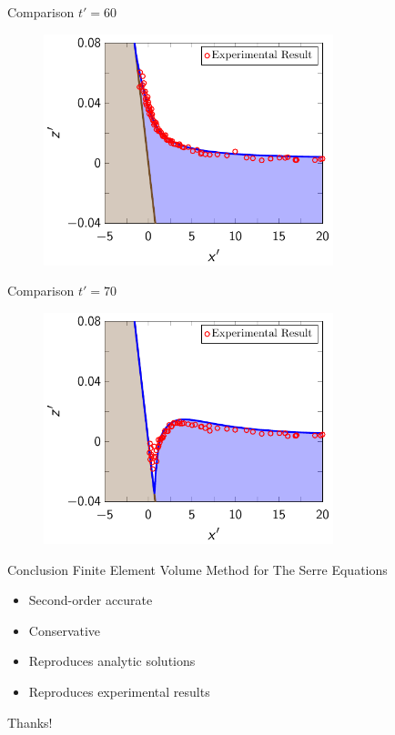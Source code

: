 \documentclass[pdf]{beamer}
\begin{document}
\begin{frame}{Comparison $t'=60$}
	\begin{figure}
		\includegraphics[width=0.75\textwidth]{./Pics/Synolakis/t=60s.pdf}
	\end{figure}
\end{frame}

\begin{frame}{Comparison $t'=70$}
	\begin{figure}
		\includegraphics[width=0.75\textwidth]{./Pics/Synolakis/t=70s.pdf}
	\end{figure}
\end{frame}

\begin{frame}{Conclusion}
	Finite Element Volume Method for The Serre Equations
	\begin{itemize}
		\item Second-order accurate
		\pause 
		\item Conservative
		\pause
		\item Reproduces analytic solutions
		\pause
		\item Reproduces experimental results
	\end{itemize}
\end{frame}

\begin{frame}{}
	\centering \Huge Thanks!
\end{frame}
\end{document}
